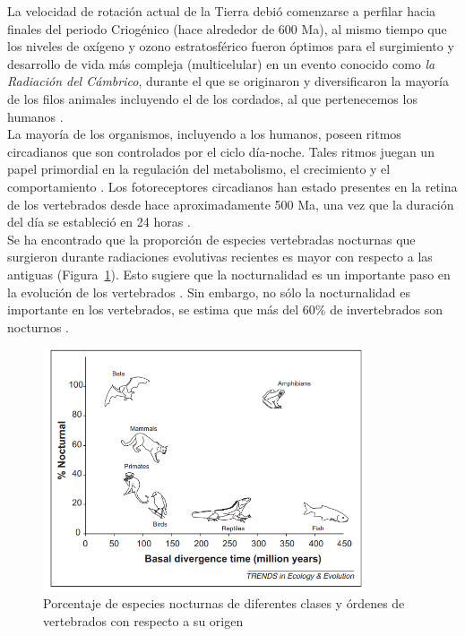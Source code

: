 La velocidad de rotación actual de la Tierra debió comenzarse a perfilar hacia finales del periodo Criogénico (hace alrededor de 600 Ma), al mismo tiempo que los niveles de oxígeno y ozono estratosférico fueron óptimos para el surgimiento y desarrollo de vida más compleja (multicelular) en un evento conocido como \textit{la Radiación del Cámbrico}, durante el que se originaron y diversificaron la mayoría de los filos animales incluyendo el de los cordados, al que pertenecemos los humanos \citep{Conway2000}.\\

La mayoría de los organismos, incluyendo a los humanos, poseen ritmos circadianos que son controlados por el ciclo día-noche. Tales ritmos juegan un papel primordial en la regulación del metabolismo, el crecimiento y el comportamiento \citep{Dunlap1999}. Los fotoreceptores circadianos han estado presentes en la retina de los vertebrados desde hace aproximadamente 500 Ma, una vez que la duración del día se estableció en 24 horas \citep{Conway2000,Longcore2006}.\\

Se ha encontrado que la proporción de especies vertebradas nocturnas que surgieron durante radiaciones evolutivas recientes es mayor con respecto a las antiguas (Figura~\ref{nocturnalidad}). Esto sugiere que la nocturnalidad es un importante paso en la evolución de los vertebrados \citep{Holker2010}. Sin embargo, no sólo la nocturnalidad es importante en los vertebrados, se estima que más del 60$\%$ de invertebrados son nocturnos \citep{Longcore2006}.


\begin{figure}[htb]
  \centering
    \includegraphics[width=95mm, scale=0.95]{nocturnalidad}
  \caption{Porcentaje de especies nocturnas de diferentes clases y órdenes de vertebrados con respecto a su origen \citep{Holker2010}}
  \label{nocturnalidad}
\end{figure}

